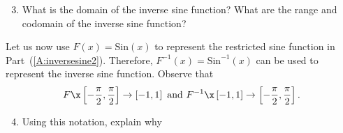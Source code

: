 \begin{activity}
\begin{enumerate}
\setcounter{enumi}{2}
\item What is the domain of the inverse sine function?  What are the range and codomain of the inverse sine function?
\end{enumerate}
%
Let us now use  $F ( x ) = \text{Sin} ( x )$ 
\label{sym:restrictsine} to represent the restricted sine function in Part~(\ref{A:inversesine2}).  Therefore, 
$F^{-1} ( x ) = \text{Sin}^{ - 1} ( x ) $
\label{sym:inversesine}  can be used to represent the inverse sine function.  Observe that
\[
F\x \left[ -{\frac{{\pi }}{2}, \frac{\pi }{2}} \right] \to \left[ { - 1, 1} \right]
	\text{ and }	
F^{ - 1} \x \left[ { - 1, 1} \right] \to \left[ -{\frac{{\pi }}{2}, \frac{\pi }
{2}} \right].
\]
%
\begin{enumerate}
\setcounter{enumi}{3}
\item Using this notation, explain why
\end{enumerate}
\hbreak


\end{activity}

\endinput

